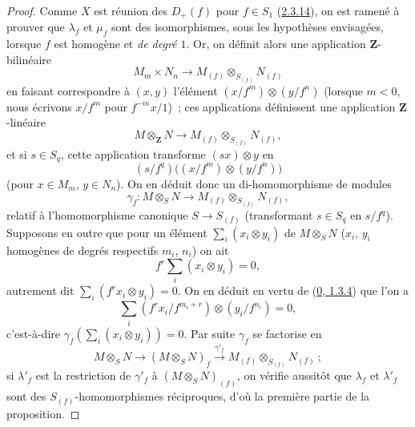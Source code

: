 \begin{proof}
Comme $X$ est réunion des $D_+(f)$ pour $f\in S_1$
(\hyperref[II.2.3.14-fr]{2.3.14}), on est ramené à prouver que $\lambda_f$
et $\mu_f$ sont des isomorphismes, sous les hypothèses envisagées, lorsque
$f$ est homogène et \emph{de degré $1$}. Or, on définit alors une
application $\mathbf{Z}$-bilinéaire
\[
  M_m\times N_n\longrightarrow
  M_{(f)}\otimes_{S_{(f)}}N_{(f)}
\]
en faisant correspondre à $(x,y)$ l'élément
$(x/f^m)\otimes(y/f^n)$ (lorsque $m<0$, nous écrivons $x/f^m$ pour
$f^{-m}x/1$)~; ces applications définissent une application
$\mathbf{Z}$-linéaire
\[
  M\otimes_{\mathbf{Z}}N\longrightarrow
  M_{(f)}\otimes_{S_{(f)}}N_{(f)},
\]
et si $s\in S_q$, cette application transforme $(sx)\otimes y$ en
\[
  (s/f^q)\bigl((x/f^m)\otimes(y/f^n)\bigr)
\]
(pour $x\in M_m$, $y\in N_n$). On en déduit donc un di-homomorphisme de
modules
\[
  \gamma_f:M\otimes_S N\longrightarrow
  M_{(f)}\otimes_{S_{(f)}}N_{(f)},
\]
relatif à l'homomorphisme canonique $S\to S_{(f)}$ (transformant
$s\in S_q$ en $s/f^q$). Supposons en outre que pour un élément
$\sum_i(x_i\otimes y_i)$ de $M\otimes_S N$ ($x_i$, $y_i$ homogènes de
degrés respectifs $m_i$, $n_i$) on ait
\[
  f^r\sum_i(x_i\otimes y_i)=0,
\]
autrement dit $\sum_i(f^rx_i\otimes y_i)=0$. On en déduit en vertu de
(\hyperref[0.1.3.4-fr]{0, 1.3.4}) que l'on a
\[
  \sum_i(f^rx_i/f^{m_i+r})\otimes(y_i/f^{n_i})=0,
\]
c'est-à-dire $\gamma_f(\sum_i(x_i\otimes y_i))=0$. Par suite $\gamma_f$
se factorise en
\[
  M\otimes_S N\longrightarrow(M\otimes_S N)_f
  \xrightarrow{\gamma'_f}
  M_{(f)}\otimes_{S_{(f)}}N_{(f)}~;
\]
si $\lambda'_f$ est la restriction de $\gamma'_f$
à $(M\otimes_S N)_{(f)}$, on vérifie aussitôt que $\lambda_f$ et
$\lambda'_f$ sont des $S_{(f)}$-homomorphismes réciproques, d'où la
première partie de la proposition.


\end{proof}
